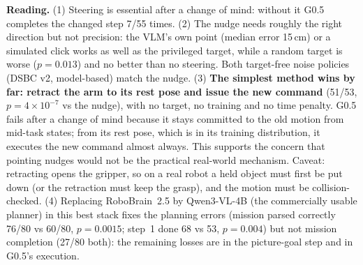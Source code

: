 \documentclass[10pt,a4paper]{article}
\begin{document}
\noindent\textbf{Reading.} (1) Steering is essential after a change of mind: without it G0.5 completes the changed step 7/55 times. (2) The nudge needs roughly the right direction but not precision: the VLM's own point (median error 15\,cm) or a simulated click works as well as the privileged target, while a random target is worse ($p=0.013$) and no better than no steering. Both target-free noise policies (DSBC v2, model-based) match the nudge. (3) \textbf{The simplest method wins by far: retract the arm to its rest pose and issue the new command} (51/53, $p=4\times10^{-7}$ vs the nudge), with no target, no training and no time penalty. G0.5 fails after a change of mind because it stays committed to the old motion from mid-task states; from its rest pose, which is in its training distribution, it executes the new command almost always. This supports the concern that pointing nudges would not be the practical real-world mechanism. Caveat: retracting opens the gripper, so on a real robot a held object must first be put down (or the retraction must keep the grasp), and the motion must be collision-checked. (4) Replacing RoboBrain~2.5 by Qwen3-VL-4B (the commercially usable planner) in this best stack fixes the planning errors (mission parsed correctly 76/80 vs 60/80, $p=0.0015$; step~1 done 68 vs 53, $p=0.004$) but not mission completion (27/80 both): the remaining losses are in the picture-goal step and in G0.5's execution.
\end{document}
